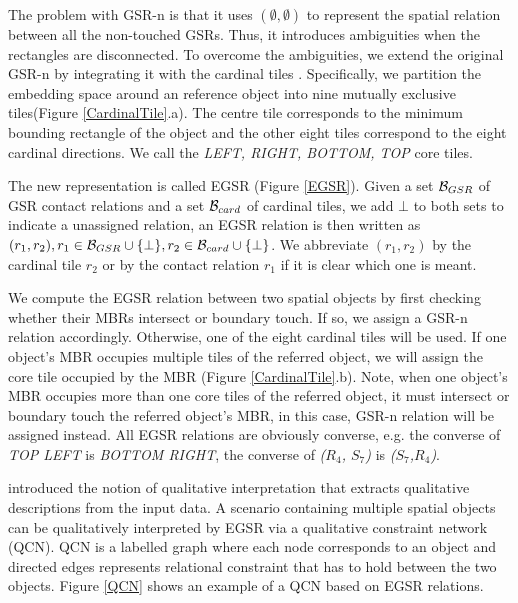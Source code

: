\documentclass[letterpaper]{article}
\begin{document}
The problem with GSR-n is that it uses $(\emptyset, \emptyset)$ to represent the spatial relation between all the non-touched GSRs. Thus, it introduces ambiguities when the rectangles are disconnected. To overcome the ambiguities, we extend the original GSR-n by integrating it with the cardinal tiles \cite{goyal1997direction}. Specifically, we partition the embedding space around an reference object into nine mutually exclusive tiles(Figure \ref{CardinalTile}.a). The centre tile corresponds to the minimum bounding rectangle of the object and the other eight tiles correspond to the eight cardinal directions. We call the \emph{LEFT, RIGHT, BOTTOM, TOP} core tiles.  



The new representation is called EGSR (Figure \ref{EGSR}). Given a set ${\cal B}_{GSR}$ of GSR contact relations and a set ${\cal B}_{card}$ of cardinal tiles,  we add $\bot$ to both sets to indicate a unassigned relation, an EGSR relation is then written as $(r_1, r_2), r_1 \in {\cal B}_{GSR}\cup \{\bot\}, r_2 \in {\cal B}_{card}\cup \{\bot\}$. We abbreviate $(r_1,r_2)$ by the cardinal tile $r_2$ or by the contact relation $r_1$ if it is clear which one is meant. 

We compute the EGSR relation between two spatial objects by first checking whether their MBRs intersect or boundary touch. If so, we assign a GSR-n relation accordingly. Otherwise, one of the eight cardinal tiles will be used. If one object's MBR occupies multiple tiles of the referred object, we will assign the core tile occupied by the MBR (Figure \ref{CardinalTile}.b). Note, when one object's MBR occupies more than one core tiles of the referred object, it must intersect or boundary touch the referred object's MBR, in this case, GSR-n relation will be assigned instead. All EGSR relations are obviously converse, e.g. the converse of \emph{TOP LEFT} is \emph{BOTTOM RIGHT}, the converse of \emph{($R_4$, $S_7$)} is \emph{($S_7$,$R_4$)}.

\cite{wallgrun2010qualitative} introduced the notion of qualitative interpretation that extracts qualitative descriptions from the input data. A scenario containing multiple spatial objects can be qualitatively interpreted by EGSR via a qualitative constraint network (QCN). QCN is a labelled graph where each node corresponds to an object and directed edges represents relational constraint that has to hold between the two objects. 
Figure \ref{QCN} shows an example of a QCN based on EGSR relations.
\end{document}
